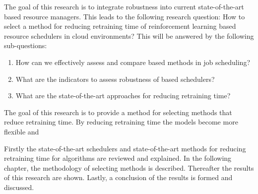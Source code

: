 The goal of this research is to integrate robustness into current
state-of-the-art \ml based resource managers. This leads to the following
research question: How to select a method for reducing retraining time of
reinforcement learning based resource schedulers in cloud environments? This
will be answered by the following sub-questions:

\begin{enumerate}
    \item How can we effectively assess and compare \rl based methods in job
        scheduling?
    \item What are the indicators to assess robustness of \rl based schedulers?
    \item What are the state-of-the-art approaches for reducing retraining time?
\end{enumerate}


The goal of this research is to provide a method for selecting methods that
reduce retraining time. By reducing retraining time the models become more
flexible and


Firstly the state-of-the-art \rl schedulers and state-of-the-art methods for
reducing retraining time for \rl algorithms are reviewed and explained. In the
following chapter, the methodology of selecting methods is described.
Thereafter the results of this research are shown. Lastly, a conclusion of the
results is formed and discussed.
